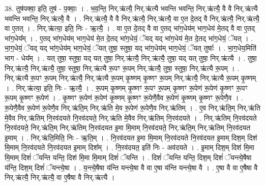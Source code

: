 \documentclass[17pt]{extarticle}
\begin{document}
38. तुष॑पक्वा॒ इति॒ तुष॑ - प॒क्वाः॒ । . भ॒व॒न्ति॒ निर्.ऋ॑त्यै॒ निर्.ऋ॑त्यै भवन्ति भवन्ति॒ निर्.ऋ॑त्यै॒ वै वै निर्.ऋ॑त्यै भवन्ति भवन्ति॒ निर्.ऋ॑त्यै॒ वै । . निर्.ऋ॑त्यै॒ वै वै निर्.ऋ॑त्यै॒ निर्.ऋ॑त्यै॒ वा ए॒त दे॒तद् वै निर्.ऋ॑त्यै॒ निर्.ऋ॑त्यै॒ वा ए॒तत् । . निर्.ऋ॑त्या॒ इति॒ निः - ऋ॒त्यै॒ । . वा ए॒त दे॒तद् वै वा ए॒तद् भा॑ग॒धेय॑म् भाग॒धेय॑ मे॒तद् वै वा ए॒तद् भा॑ग॒धेय᳚म् । . ए॒तद् भा॑ग॒धेय॑म् भाग॒धेय॑ मे॒त दे॒तद् भा॑ग॒धेयं॒ ॅयद् यद् भा॑ग॒धेय॑ मे॒त दे॒तद् भा॑ग॒धेयं॒ ॅयत् । . भा॒ग॒धेयं॒ ॅयद् यद् भा॑ग॒धेय॑म् भाग॒धेयं॒ ॅयत् तुषा॒ स्तुषा॒ यद् भा॑ग॒धेय॑म् भाग॒धेयं॒ ॅयत् तुषाः᳚ । . भा॒ग॒धेय॒मिति॑ भाग - धेय᳚म् । . यत् तुषा॒ स्तुषा॒ यद् यत् तुषा॒ निर्.ऋ॑त्यै॒ निर्.ऋ॑त्यै॒ तुषा॒ यद् यत् तुषा॒ निर्.ऋ॑त्यै । . तुषा॒ निर्.ऋ॑त्यै॒ निर्.ऋ॑त्यै॒ तुषा॒ स्तुषा॒ निर्.ऋ॑त्यै रू॒पꣳ रू॒पम् निर्.ऋ॑त्यै॒ तुषा॒ स्तुषा॒ निर्.ऋ॑त्यै रू॒पम् । . निर्.ऋ॑त्यै रू॒पꣳ रू॒पम् निर्.ऋ॑त्यै॒ निर्.ऋ॑त्यै रू॒पम् कृ॒ष्णम् कृ॒ष्णꣳ रू॒पम् निर्.ऋ॑त्यै॒ निर्.ऋ॑त्यै रू॒पम् कृ॒ष्णम् । . निर्.ऋ॑त्या॒ इति॒ निः - ऋ॒त्यै॒ । . रू॒पम् कृ॒ष्णम् कृ॒ष्णꣳ रू॒पꣳ रू॒पम् कृ॒ष्णꣳ रू॒पेण॑ रू॒पेण॑ कृ॒ष्णꣳ रू॒पꣳ रू॒पम् कृ॒ष्णꣳ रू॒पेण॑ । . कृ॒ष्णꣳ रू॒पेण॑ रू॒पेण॑ कृ॒ष्णम् कृ॒ष्णꣳ रू॒पेणै॒वैव रू॒पेण॑ कृ॒ष्णम् कृ॒ष्णꣳ रू॒पेणै॒व । . रू॒पेणै॒वैव रू॒पेण॑ रू॒पेणै॒व निर्.ऋ॑ति॒म् निर्.ऋ॑ति मे॒व रू॒पेण॑ रू॒पेणै॒व निर्.ऋ॑तिम् । . ए॒व निर्.ऋ॑ति॒म् निर्.ऋ॑ति मे॒वैव निर्.ऋ॑तिम् नि॒रव॑दयते नि॒रव॑दयते॒ निर्.ऋ॑ति मे॒वैव निर्.ऋ॑तिम् नि॒रव॑दयते । . निर्.ऋ॑तिम् नि॒रव॑दयते नि॒रव॑दयते॒ निर्.ऋ॑ति॒म् निर्.ऋ॑तिम् नि॒रव॑दयत इ॒मा मि॒माम् नि॒रव॑दयते॒ निर्.ऋ॑ति॒म् निर्.ऋ॑तिम् नि॒रव॑दयत इ॒माम् । . निर्.ऋ॑ति॒मिति॒ निः - ऋ॒ति॒म् । . नि॒रव॑दयत इ॒मा मि॒माम् नि॒रव॑दयते नि॒रव॑दयत इ॒माम् दिश॒म् दिश॑ मि॒माम् नि॒रव॑दयते नि॒रव॑दयत इ॒माम् दिश᳚म् । . नि॒रव॑दयत॒ इति॑ निः - अव॑दयते । . इ॒माम् दिश॒म् दिश॑ मि॒मा मि॒माम् दिशं॑ ॅयन्ति यन्ति॒ दिश॑ मि॒मा मि॒माम् दिशं॑ ॅयन्ति । . दिशं॑ ॅयन्ति यन्ति॒ दिश॒म् दिशं॑ ॅयन्त्ये॒षैषा य॑न्ति॒ दिश॒म् दिशं॑ ॅयन्त्ये॒षा । . य॒न्त्ये॒षैषा य॑न्ति यन्त्ये॒षा वै वा ए॒षा य॑न्ति यन्त्ये॒षा वै । . ए॒षा वै वा ए॒षैषा वै निर्.ऋ॑त्यै॒ निर्.ऋ॑त्यै॒ वा ए॒षैषा वै निर्.ऋ॑त्यै । \newline
\pagebreak
{}
\end{document}
